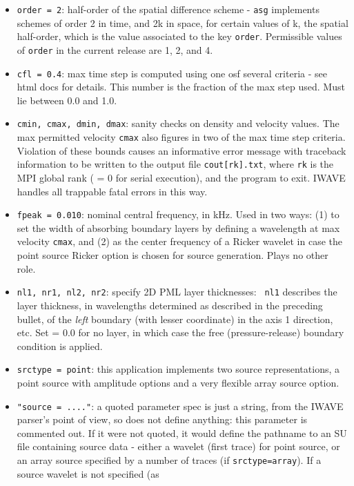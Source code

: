 \begin{itemize}
\item {\tt order = 2}: half-order of the spatial difference scheme -
  {\tt asg} implements schemes of order 2 in time, and 2k in space,
  for certain values of k, the spatial half-order, which is the value
  associated to the key {\tt order}. Permissible values
  of {\tt order} in the current release are 1, 2, and 4.
\item {\tt cfl = 0.4}: max time step is computed using one osf several
  criteria - see html docs for details. This number is the fraction of
  the max step used. Must lie between 0.0 and 1.0.
\item{\tt cmin, cmax, dmin, dmax}: sanity checks on density and
  velocity values. The max permitted velocity {\tt cmax} also figures
  in two of the max time step criteria. Violation of these bounds
  causes an informative error message with traceback information to be
  written to the output file {\tt cout[rk].txt}, where {\tt rk} is the
  MPI global rank ( = 0 for serial execution), and the program to
  exit. IWAVE handles all trappable fatal errors in this way.
\item {\tt fpeak = 0.010}: nominal central frequency, in kHz. Used in
  two ways: (1) to set the width of absorbing boundary layers by
  defining a wavelength at max velocity {\tt cmax}, and (2) as the
  center frequency of a Ricker wavelet in case the point source Ricker
  option is chosen for source generation. Plays no other role.
\item {\tt nl1, nr1, nl2, nr2}: specify 2D PML layer thicknesses: {\tt
    nl1} describes the layer thickness, in wavelengths determined as
  described in the preceding bullet, of the {\em left} boundary (with
  lesser coordinate) in the axis 1 direction, etc. Set = 0.0 for no
  layer, in which case the free (pressure-release) boundary condition
  is applied.
\item {\tt srctype = point}: this application implements two source
  representations, a point source with amplitude options and a very flexible array
  source option.
\item{\tt "source  = ...."}: a quoted parameter spec is just a
  string, from the IWAVE parser's point of view, so does not define
  anything: this parameter is commented out. If it were not quoted, it
  would define the pathname to an SU file containing source data -
  either a  wavelet (first trace) for point source, or an array source specified
  by a number of traces (if {\tt srctype=array}). If a source wavelet is not specified (as

\end{itemize}
